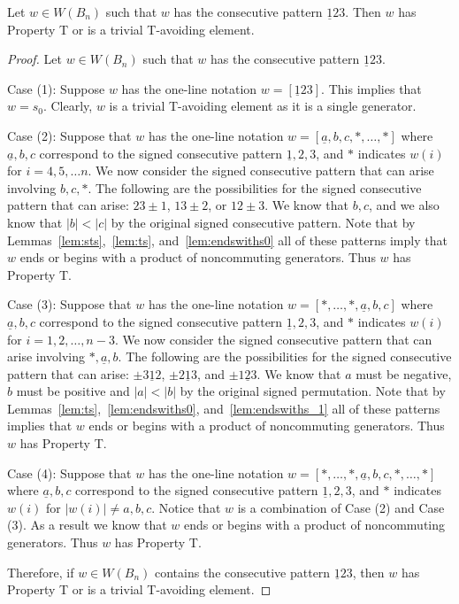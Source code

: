 \begin{lemma}\label{lem:123}
Let $w \in W(B_n)$ such that $w$ has the consecutive pattern $\underline{1}23$. Then $w$ has Property T or is a trivial T-avoiding element.
\begin{proof}
	Let $w \in W(B_n)$ such that $w$ has the consecutive pattern $\underline{1}23$.
	
	Case (1): Suppose $w$ has the one-line notation $w=[\underline{1}23]$. This implies that $w=s_0$. Clearly, $w$ is a trivial T-avoiding element as it is a single generator.
	
	Case (2): Suppose that $w$ has the one-line notation $w=[\underline{a},b,c, \ast, \ldots, \ast]$ where $\underline{a},b,c$ correspond to the signed consecutive pattern $\underline{1},2,3$, and $\ast$ indicates $w(i)$ for $i=4,5, \ldots n$. We now consider the signed consecutive pattern that can arise involving $b,c, \ast$. The following are the possibilities for the signed consecutive pattern that can arise: $23\pm1$, $13 \pm2$, or $12\pm3$. We know that $b,c$, and we also know that $|b|<|c|$ by the original signed consecutive pattern. Note that by Lemmas~\ref{lem:sts},~\ref{lem:ts}, and~\ref{lem:endswiths0} all of these patterns imply that $w$ ends or begins with a product of noncommuting generators. Thus $w$ has Property T.
	
	Case (3): Suppose that $w$ has the one-line notation $w=[\ast, \ldots, \ast, \underline{a},b,c]$ where $\underline{a},b,c$ correspond to the signed consecutive pattern $\underline{1},2,3$, and $\ast$ indicates $w(i)$ for $i=1,2, \ldots ,n-3$. We now consider the signed consecutive pattern that can arise involving $\ast, \underline{a}, b$. The following are the possibilities for the signed consecutive pattern that can arise: $\pm3 \underline{1} 2$, $\pm 2 \underline{1} 3$, and $\pm 1 \underline{2} 3$. We know that $a$ must be negative, $b$ must be positive and $|a|<|b|$ by the original signed permutation. Note that by Lemmas~\ref{lem:ts},~\ref{lem:endswiths0}, and~\ref{lem:endswiths_1} all of these patterns implies that $w$ ends or begins with a product of noncommuting generators. Thus $w$ has Property T. 
	
	Case (4): Suppose that $w$ has the one-line notation $w=[\ast, \ldots, \ast, \underline{a},b,c, \ast, \ldots, \ast]$ where $\underline{a},b,c$ correspond to the signed consecutive pattern $\underline{1},2,3$, and $\ast$ indicates $w(i)$ for $|w(i)|\neq a,b,c$. Notice that $w$ is a combination of Case (2) and Case (3). As a result we know that $w$ ends or begins with a product of noncommuting generators. Thus $w$ has Property T.

	Therefore, if $w \in W(B_n)$ contains the consecutive pattern $\underline{1}23$, then $w$ has Property T or is a trivial T-avoiding element.
\end{proof}	
\end{lemma}

